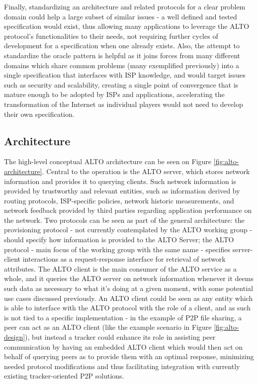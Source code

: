         Finally, standardizing an architecture and related protocols for a clear problem domain could help a large subset of similar issues - a well defined and tested specification would exist, thus allowing many applications to leverage the ALTO protocol's functionalities to their needs, not requiring further cycles of development for a specification when one already exists.
        Also, the attempt to standardize the oracle pattern is helpful as it joins forces from many different domains which share common problems (many exemplified previously) into a single specification that interfaces with ISP knowledge, and would target issues such as security and scalability, creating a single point of convergence that is mature enough to be adopted by ISPs and applications, accelerating the transformation of the Internet as individual players would not need to develop their own specification.

    \subsection{Architecture}

        The high-level conceptual ALTO architecture can be seen on Figure \ref{fig:alto-architecture}.
        Central to the operation is the ALTO server, which stores network information and provides it to querying clients.
        Such network information is provided by trustworthy and relevant entities, such as information derived by routing protocols, ISP-specific policies, network historic measurements, and network feedback provided by third parties regarding application performance on the network.
        Two protocols can be seen as part of the general architecture: the provisioning protocol - not currently contemplated by the ALTO working group - should specify how information is provided to the ALTO Server; the ALTO protocol - main focus of the working group with the same name - specifies server-client interactions as a request-response interface for retrieval of network attributes.
        The ALTO client is the main consumer of the ALTO service as a whole, and it queries the ALTO server on network information whenever it deems such data as necessary to what it's doing at a given moment, with some potential use cases discussed previously.
        An ALTO client could be seen as any entity which is able to interface with the ALTO protocol with the role of a client, and as such is not tied to a specific implementation - in the example of P2P file sharing, a peer can act as an ALTO client (like the example scenario in Figure \ref{fig:alto-design}), but instead a tracker could enhance its role in assisting peer communication by having an embedded ALTO client which would then act on behalf of querying peers as to provide them with an optimal response, minimizing needed protocol modifications and thus facilitating integration with currently existing tracker-oriented P2P solutions.

